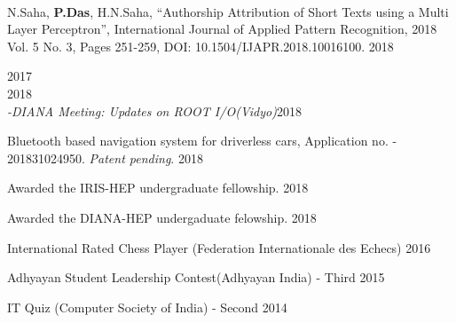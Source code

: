 \documentclass[10pt, letterpaper]{deps1}
\begin{document}
%
%
\vspace{-5pt}
\\
\vspace{-5pt}

%
%
\small{\begin{tightitemize}
    \item N.Saha, {\textbf{P.Das}}, H.N.Saha, ``Authorship Attribution of Short Texts using a Multi Layer Perceptron'', International Journal of Applied Pattern Recognition, 2018 Vol. 5 No. 3, Pages 251-259, DOI: 10.1504/IJAPR.2018.10016100. \hfill{2018}
\end{tightitemize}}

%
%
\hfill{2017}\\
 \hfill{2018}\\ 
\hspace*{1ex}\hspace*{1ex}\hspace*{1ex}\hspace*{1ex}\hspace*{1ex}\hspace*{1ex}\hspace*{1ex}\hspace*{0.4ex}\textit{{\small {-DIANA Meeting: Updates on ROOT I/O(Vidyo)}}}\hfill{2018}\vspace{1pt}

%
%
\small{\begin{tightitemize}
    \item Bluetooth based navigation system for driverless cars, Application no. - 201831024950. {\textit{Patent pending}}. \hfill{2018}
\end{tightitemize}}

%
%
\begin{tightitemize}
    \item Awarded the IRIS-HEP undergraduate fellowship. \hfill{2018}
	\item Awarded the DIANA-HEP undergaduate felowship. \hfill{2018}
	\item International Rated Chess Player (Federation Internationale des Echecs) \hfill{2016}
	\item Adhyayan Student Leadership Contest(Adhyayan India) - Third \hfill{2015}
	\item IT Quiz (Computer Society of India) - Second \hfill{2014}
\end{tightitemize}
\end{document}
